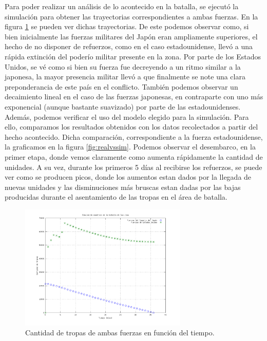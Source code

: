 \documentclass{sig-alternate}
\begin{document}
Para poder realizar un análisis de lo acontecido en la batalla, se ejecutó la simulación para obtener las 
trayectorias correspondientes a ambas fuerzas. En la figura \ref{fig:trays} se pueden ver dichas trayectorias. 
De este podemos observar como, si bien inicialmente las fuerzas militares del Japón eran ampliamente superiores, el hecho de no disponer de 
refuerzos, como en el caso estadounidense, llevó a una rápida extinción del poderío militar presente en la zona. Por parte de los 
Estados Unidos, se vé como si bien su fuerza fue decreyendo a un ritmo similar a la japonesa, la mayor presencia militar llevó a que finalmente
se note una clara preponderancia de este país en el conflicto. También podemos observar un decaimiento lineal en el caso de las fuerzas japonesas,
en contraparte con uno más exponencial (aunque bastante suavizado) por parte de las estadounidenses.\\
Además, podemos verificar el uso del modelo elegido para la simulación. Para ello, comparamos los resultados obtenidos con los datos 
recolectados a partir del hecho acontecido. Dicha comparación, correspondiente a la fuerza estadounidense, la graficamos en la figura 
\ref{fig:realvssim}.
Podemos observar el desembarco, en la primer etapa, donde vemos claramente como aumenta rápidamente la cantidad de unidades. A su vez, durante los primeros 5 días al recibirse los refuerzos, se
puede ver como se producen picos, donde los aumentos estan dados por la llegada de nuevas unidades y las disminuciones más bruscas estan dadas
por las bajas producidas durante el asentamiento de las tropas en el área de batalla.

\begin{figure}[h]
\begin{center}
\includegraphics[width=8cm]{jap_vs_usa.png}
\caption{\label{fig:trays}Cantidad de tropas de ambas fuerzas en función del tiempo.}
\end{center}
\end{figure}
\end{document}
